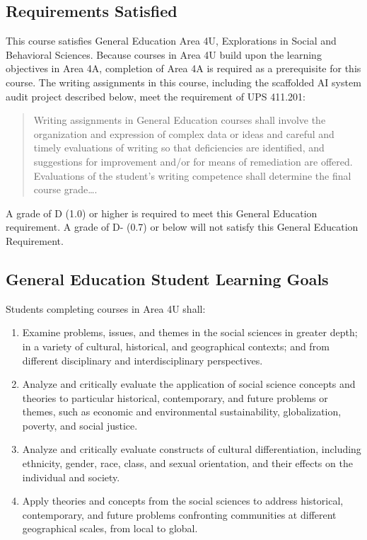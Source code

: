 \documentclass[12pt]{article}
\begin{document}
\subsection*{Requirements Satisfied}
This course satisfies General Education Area 4U, Explorations in Social and Behavioral Sciences. Because courses in Area 4U build upon the learning objectives in Area 4A, completion of Area 4A is required as a prerequisite for this course. The writing assignments in this course, including the scaffolded AI system audit project described below, meet the requirement of UPS 411.201:
\begin{quote}Writing assignments in General Education courses shall involve the organization and expression of complex data or ideas and careful and timely evaluations of writing so that deficiencies are identified, and suggestions for improvement and/or for means of remediation are offered. Evaluations of the student's writing competence shall determine the final course grade\ldots .\end{quote}
A grade of D (1.0) or higher is required to meet this General Education requirement. A grade of D- (0.7) or below will not satisfy this General Education Requirement.
\subsection*{General Education Student Learning Goals}
Students completing courses in Area 4U shall:
\begin{enumerate}
    \item Examine problems, issues, and themes in the social sciences in greater depth; in a variety of cultural, historical, and geographical contexts; and from different disciplinary and interdisciplinary perspectives.
    \item Analyze and critically evaluate the application of social science concepts and theories to particular historical, contemporary, and future problems or themes, such as economic and environmental sustainability, globalization, poverty, and social justice.
    \item Analyze and critically evaluate constructs of cultural differentiation, including ethnicity, gender, race, class, and sexual orientation, and their effects on the individual and society.
    \item Apply theories and concepts from the social sciences to address historical, contemporary, and future problems confronting communities at different geographical scales, from local to global.
\end{enumerate}
\end{document}
